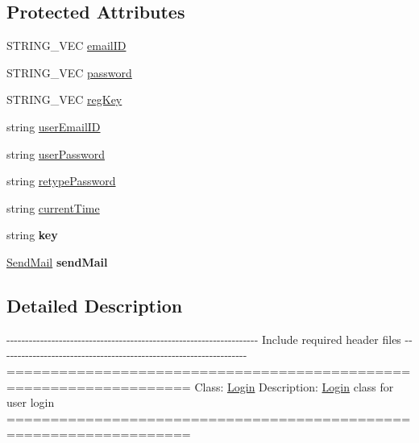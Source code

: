 \subsection*{\-Protected \-Attributes}
\begin{DoxyCompactItemize}
\item 
\-S\-T\-R\-I\-N\-G\-\_\-\-V\-E\-C \hyperlink{classLogin_abea56d6d6403f1e627294f222dd77310}{email\-I\-D}
\item 
\-S\-T\-R\-I\-N\-G\-\_\-\-V\-E\-C \hyperlink{classLogin_a39f7fd03b2b27c927c657ee73e7fcbbc}{password}
\item 
\-S\-T\-R\-I\-N\-G\-\_\-\-V\-E\-C \hyperlink{classLogin_ae22f0ed73e5248cd71a7b2167676376a}{reg\-Key}
\item 
string \hyperlink{classLogin_aa83b4706e0f0f0afc65f210ee8e4839a}{user\-Email\-I\-D}
\item 
string \hyperlink{classLogin_a9731be126468f535f161f045c95687c6}{user\-Password}
\item 
string \hyperlink{classLogin_ade36f8943aafce470ef4b8353c79b2c6}{retype\-Password}
\item 
string \hyperlink{classLogin_a624f15ecf989648b73a91743f67a6880}{current\-Time}
\item 
\hypertarget{classLogin_ab7769b44690490b43fc9046ad5958baf}{string {\bfseries key}}\label{dd/dfd/classLogin_ab7769b44690490b43fc9046ad5958baf}

\item 
\hypertarget{classLogin_a36ff1dd294aaaf884805325cee3b83d3}{\hyperlink{classSendMail}{\-Send\-Mail} {\bfseries send\-Mail}}\label{dd/dfd/classLogin_a36ff1dd294aaaf884805325cee3b83d3}

\end{DoxyCompactItemize}


\subsection{\-Detailed \-Description}
-\/-\/-\/-\/-\/-\/-\/-\/-\/-\/-\/-\/-\/-\/-\/-\/-\/-\/-\/-\/-\/-\/-\/-\/-\/-\/-\/-\/-\/-\/-\/-\/-\/-\/-\/-\/-\/-\/-\/-\/-\/-\/-\/-\/-\/-\/-\/-\/-\/-\/-\/-\/-\/-\/-\/-\/-\/-\/-\/-\/-\/-\/-\/-\/-\/-\/-\/ \-Include required header files -\/-\/-\/-\/-\/-\/-\/-\/-\/-\/-\/-\/-\/-\/-\/-\/-\/-\/-\/-\/-\/-\/-\/-\/-\/-\/-\/-\/-\/-\/-\/-\/-\/-\/-\/-\/-\/-\/-\/-\/-\/-\/-\/-\/-\/-\/-\/-\/-\/-\/-\/-\/-\/-\/-\/-\/-\/-\/-\/-\/-\/-\/-\/-\/-\/-\/ =================================================================== \-Class\-: \hyperlink{classLogin}{\-Login} \-Description\-: \hyperlink{classLogin}{\-Login} class for user login ===================================================================

